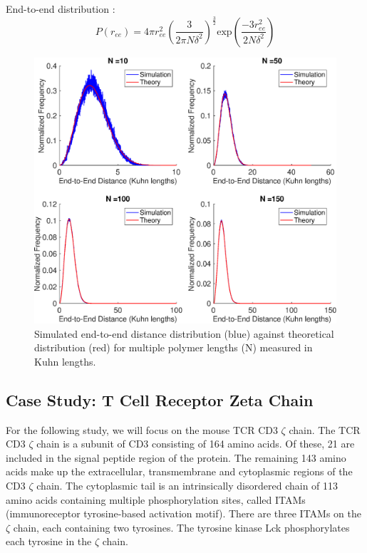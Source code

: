 \documentclass[../AdvancementSummary.tex]{subfiles}
\begin{document}
End-to-end distribution \cite{VanValen2009, Reeves2011}:
\begin{equation*}
P(r_{ee}) = 4\pi r_{ee}^2 \left( \frac{3}{2\pi N \delta^2}\right)^{\frac{3}{2}}\text{exp}\left(\frac{-3r_{ee}^2}{2N \delta^2}\right)
\end{equation*}

\begin{figure}[H]
\begin{center}
\includegraphics[width=0.8\linewidth]{ModelConfirmationFigures/ReeDistribution.eps}
\caption{Simulated end-to-end distance distribution (blue) against theoretical distribution (red) for multiple polymer lengths (N) measured in Kuhn lengths. \label{fig: ReeDist}}
\end{center}
\end{figure}


\subsection{Case Study: T Cell Receptor Zeta Chain}
\label{sec:ModelDevsubsec:TCR}
For the following study, we will focus on the mouse TCR CD3 $\zeta$ chain. The TCR CD3 $\zeta$ chain is a subunit of CD3 consisting of 164 amino acids. Of these, 21 are included in the signal peptide region of the protein. The remaining 143 amino acids make up the extracellular, transmembrane and cytoplasmic regions of the CD3 $\zeta$ chain. The cytoplasmic tail is an intrinsically disordered chain of 113 amino acids containing multiple phosphorylation sites, called ITAMs (immunoreceptor tyrosine-based activation motif). There are three ITAMs on the $\zeta$ chain, each containing two tyrosines. The tyrosine kinase Lck phosphorylates each tyrosine in the $\zeta$ chain. 
\end{document}
